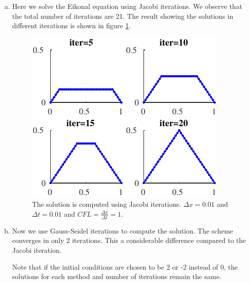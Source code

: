 \documentclass[10pt,a4paper,twoside, french]{article}
\numberwithin{equation}{section}
\numberwithin{figure}{section}
\numberwithin{table}{section}
\begin{document}
\begin{enumerate}
\begin{enumerate}[a.]
\item Here we solve the Eikonal equation using Jacobi iterations. We observe that the total number of iterations are 21. The result showing the solutions in different iterations is shown in figure \ref{fig:task2}.
\begin{figure}[h]
\centering
\includegraphics[scale=1.5]{fig/Task2}
\caption{The solution is computed using Jacobi iterations. $\Delta x=0.01$ and $\Delta t=0.01$ and $CFL=\frac{\Delta x}{\Delta t}=1$.}
\label{fig:task2}
\end{figure}

\item Now we use Gauss-Seidel iterations to compute the solution. The scheme converges in only 2 iterations. This a considerable difference compared to the Jacobi iteration.

Note that if the initial conditions are chosen to be 2 or -2 instead of 0, the solutions for each method and number of iterations remain the same. 


\end{enumerate}
\end{enumerate}
\end{document}
